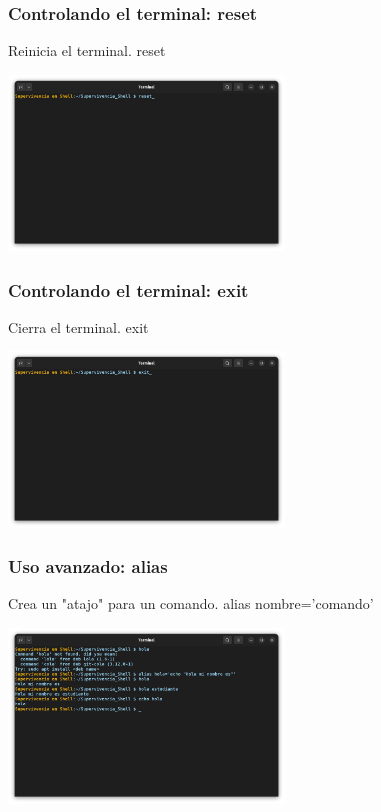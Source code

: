 \documentclass[10pt]{beamer}
\begin{document}
	\begin{frame}
		\frametitle{Controlando el terminal: reset}
		\begin{alertblock}{Reinicia el terminal.}
			reset
		\end{alertblock}
		\begin{center}
			\includegraphics[width=0.55\textwidth]{reset}
		\end{center}
	\end{frame}	
	
	\begin{frame}
		\frametitle{Controlando el terminal: exit}
		\begin{alertblock}{Cierra el terminal.}
			exit
		\end{alertblock}
		\begin{center}\includegraphics[width=0.55\textwidth]{exit}
		\end{center}
	\end{frame}

	\begin{frame}
		\frametitle{Uso avanzado: alias}
		\begin{alertblock}{Crea un "atajo" para un comando.}
			alias nombre='comando'
		\end{alertblock}
		\begin{center}
			\includegraphics[width=0.55\textwidth]{alias}
		\end{center}
	\end{frame}	
\end{document}
